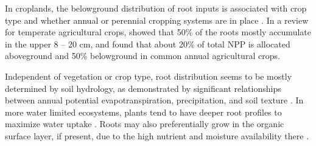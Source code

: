 \documentclass[11pt, oneside, a4paper]{article}   	%
\begin{document}


In croplands, the belowground distribution of root inputs is associated with crop type and whether annual or perennial cropping systems are in place \citep{Mosier2021, HicksPries2023}.
In a review for temperate agricultural crops, \citet{Fan2016} showed that 50\% of the roots mostly accumulate in the upper 8 -- 20 cm, and \citet{Bolinder2007} found that about 20\% of total NPP is allocated aboveground and 50\% belowground in common annual agricultural crops.

Independent of vegetation or crop type, root distribution seems to be mostly determined by soil hydrology, as
demonstrated by significant relationships between annual potential evapotranspiration, precipitation, and soil texture \citep{Schenk2002a}. In more water limited ecosystems, plants tend to have deeper root profiles to maximize water uptake
\citep{Schenk2002b}. Roots may also preferentially grow in the organic surface layer, if present, due to the high nutrient and moisture availability there \citep{Jordan1980, Schenk2002a}.
\end{document}
